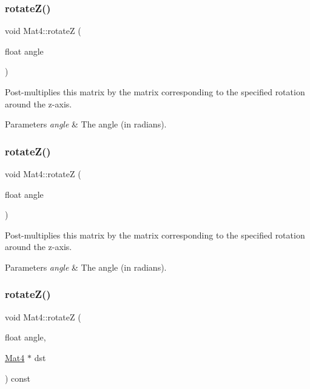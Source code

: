 \subsubsection{\texorpdfstring{rotate\+Z()}{rotateZ()}\hspace{0.1cm}{\footnotesize\ttfamily [1/4]}}
{\footnotesize\ttfamily void Mat4\+::rotateZ (\begin{DoxyParamCaption}\item[{float}]{angle }\end{DoxyParamCaption})}

Post-\/multiplies this matrix by the matrix corresponding to the specified rotation around the z-\/axis.


\begin{DoxyParams}{Parameters}
{\em angle} & The angle (in radians). \\
\hline
\end{DoxyParams}
\mbox{\label{classMat4_a31f8fbbe32864fef9477c4d520a4c365}} 
\subsubsection{\texorpdfstring{rotate\+Z()}{rotateZ()}\hspace{0.1cm}{\footnotesize\ttfamily [2/4]}}
{\footnotesize\ttfamily void Mat4\+::rotateZ (\begin{DoxyParamCaption}\item[{float}]{angle }\end{DoxyParamCaption})}

Post-\/multiplies this matrix by the matrix corresponding to the specified rotation around the z-\/axis.


\begin{DoxyParams}{Parameters}
{\em angle} & The angle (in radians). \\
\hline
\end{DoxyParams}
\mbox{\label{classMat4_a9320c6f0c192eed1da05f8e1dcea7a1b}} 
\subsubsection{\texorpdfstring{rotate\+Z()}{rotateZ()}\hspace{0.1cm}{\footnotesize\ttfamily [3/4]}}
{\footnotesize\ttfamily void Mat4\+::rotateZ (\begin{DoxyParamCaption}\item[{float}]{angle,  }\item[{\hyperlink{classMat4}{Mat4} $\ast$}]{dst }\end{DoxyParamCaption}) const}

